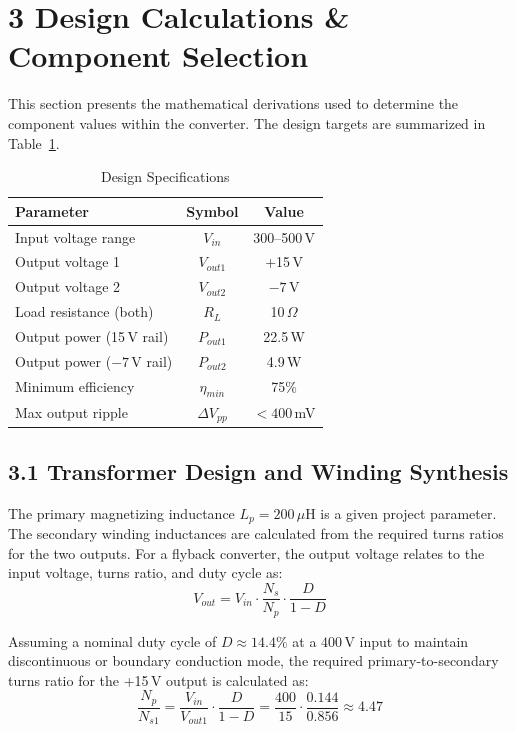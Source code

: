 \section*{3 Design Calculations \& Component Selection}

This section presents the mathematical derivations used to determine the component values within the converter. The design targets are summarized in Table~\ref{tab:specs}.

\begin{table}[H]
\centering
\caption{Design Specifications}
\label{tab:specs}
\begin{tabular}{lcc}
\toprule
\textbf{Parameter} & \textbf{Symbol} & \textbf{Value} \\
\midrule
Input voltage range & $V_{in}$ & 300--500\,V \\
Output voltage 1 & $V_{out1}$ & +15\,V \\
Output voltage 2 & $V_{out2}$ & $-7$\,V \\
Load resistance (both) & $R_L$ & 10\,$\Omega$ \\
Output power (15\,V rail) & $P_{out1}$ & 22.5\,W \\
Output power ($-7$\,V rail) & $P_{out2}$ & 4.9\,W \\
Minimum efficiency & $\eta_{min}$ & 75\% \\
Max output ripple & $\Delta V_{pp}$ & $<400$\,mV \\
\bottomrule
\end{tabular}
\end{table}

\subsection*{3.1 Transformer Design and Winding Synthesis}

The primary magnetizing inductance $L_p = 200\,\mu$H is a given project parameter. The secondary winding inductances are calculated from the required turns ratios for the two outputs. For a flyback converter, the output voltage relates to the input voltage, turns ratio, and duty cycle as:
\begin{equation}
V_{out} = V_{in} \cdot \frac{N_s}{N_p} \cdot \frac{D}{1-D}
\label{eq:flyback}
\end{equation}

Assuming a nominal duty cycle of $D \approx 14.4\%$ at a $400$\,V input to maintain discontinuous or boundary conduction mode, the required primary-to-secondary turns ratio for the +15\,V output is calculated as:
\begin{equation}
\frac{N_p}{N_{s1}} = \frac{V_{in}}{V_{out1}} \cdot \frac{D}{1-D} = \frac{400}{15} \cdot \frac{0.144}{0.856} \approx 4.47
\end{equation}

